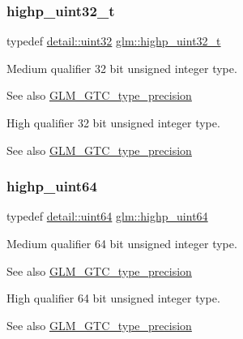 \subsubsection{\texorpdfstring{highp\+\_\+uint32\+\_\+t}{highp\_uint32\_t}}
{\footnotesize\ttfamily typedef \hyperlink{namespaceglm_1_1detail_ade6cfbf377022aaa391af8cd50489222}{detail\+::uint32} \hyperlink{group__gtc__type__precision_ga8eb85ad460079c63b68866ae34637bda}{glm\+::highp\+\_\+uint32\+\_\+t}}

Medium qualifier 32 bit unsigned integer type. \begin{DoxySeeAlso}{See also}
\hyperlink{group__gtc__type__precision}{G\+L\+M\+\_\+\+G\+T\+C\+\_\+type\+\_\+precision}
\end{DoxySeeAlso}
High qualifier 32 bit unsigned integer type. \begin{DoxySeeAlso}{See also}
\hyperlink{group__gtc__type__precision}{G\+L\+M\+\_\+\+G\+T\+C\+\_\+type\+\_\+precision} 
\end{DoxySeeAlso}
\mbox{\label{group__gtc__type__precision_ga8079c653e20cda03d34b99de629a7b09}} 
\subsubsection{\texorpdfstring{highp\+\_\+uint64}{highp\_uint64}}
{\footnotesize\ttfamily typedef \hyperlink{namespaceglm_1_1detail_adec4b19bf4982125e122db2fe03c5810}{detail\+::uint64} \hyperlink{group__gtc__type__precision_ga8079c653e20cda03d34b99de629a7b09}{glm\+::highp\+\_\+uint64}}

Medium qualifier 64 bit unsigned integer type. \begin{DoxySeeAlso}{See also}
\hyperlink{group__gtc__type__precision}{G\+L\+M\+\_\+\+G\+T\+C\+\_\+type\+\_\+precision}
\end{DoxySeeAlso}
High qualifier 64 bit unsigned integer type. \begin{DoxySeeAlso}{See also}
\hyperlink{group__gtc__type__precision}{G\+L\+M\+\_\+\+G\+T\+C\+\_\+type\+\_\+precision} 
\end{DoxySeeAlso}
\mbox{\label{group__gtc__type__precision_ga6e66f40c5909bfc872b068187fa6029e}} 
